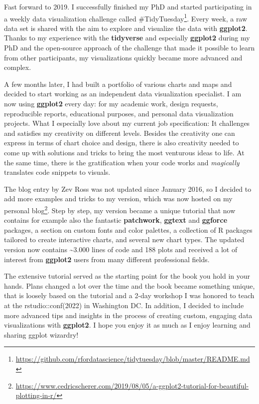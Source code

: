 \documentclass[
]{krantz}
\renewcommand{\href}[2]{#2\footnote{\url{#1}}}
\begin{document}
Fast forward to 2019. I successfully finished my PhD and started participating in a weekly data visualization challenge called \href{https://github.com/rfordatascience/tidytuesday/blob/master/README.md}{\#TidyTuesday}. Every week, a raw data set is shared with the aim to explore and visualize the data with \textbf{ggplot2}. Thanks to my experience with the \textbf{tidyverse} and especially \textbf{ggplot2} during my PhD and the open-source approach of the challenge that made it possible to learn from other participants, my visualizations quickly became more advanced and complex.

A few months later, I had built a portfolio of various charts and maps and decided to start working as an independent data visualization specialist. I am now using \textbf{ggplot2} every day: for my academic work, design requests, reproducible reports, educational purposes, and personal data visualization projects. What I especially love about my current job specification: It challenges and satisfies my creativity on different levels. Besides the creativity one can express in terms of chart choice and design, there is also creativity needed to come up with solutions and tricks to bring the most venturous ideas to life. At the same time, there is the gratification when your code works and \emph{magically} translates code snippets to visuals.

The blog entry by Zev Ross was not updated since January 2016, so I decided to add more examples and tricks to my version, which was now hosted on my \href{https://www.cedricscherer.com/2019/08/05/a-ggplot2-tutorial-for-beautiful-plotting-in-r/}{personal blog}. Step by step, my version became a unique tutorial that now contains for example also the fantastic \textbf{patchwork}, \textbf{ggtext} and \textbf{ggforce} packages, a section on custom fonts and color palettes, a collection of R packages tailored to create interactive charts, and several new chart types. The updated version now contains \textasciitilde3.000 lines of code and 188 plots and received a lot of interest from \textbf{ggplot2} users from many different professional fields.

The extensive tutorial served as the starting point for the book you hold in your hands. Plans changed a lot over the time and the book became something unique, that is loosely based on the tutorial and a 2-day workshop I was honored to teach at the rstudio::conf(2022) in Washington DC. In addition, I decided to include more advanced tips and insights in the process of creating custom, engaging data visualizations with \textbf{ggplot2}. I hope you enjoy it as much as I enjoy learning and sharing ggplot wizardry!
\end{document}
